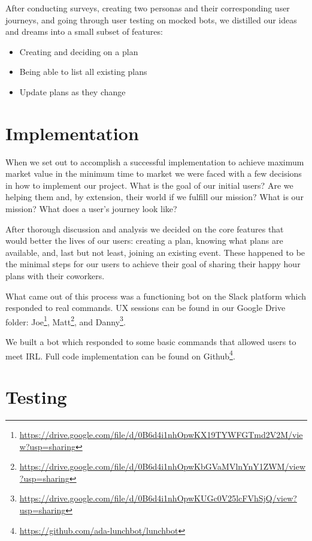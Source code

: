 \documentclass[english,a4paper,]{report}
\renewcommand{\href}[2]{#2\footnote{\url{#1}}}
\providecommand{\tightlist}{%
  \setlength{\itemsep}{0pt}\setlength{\parskip}{0pt}}
\begin{document}
After conducting surveys, creating two personas and their corresponding
user journeys, and going through user testing on mocked bots, we
distilled our ideas and dreams into a small subset of features:

\begin{itemize}
\tightlist
\item
  Creating and deciding on a plan
\item
  Being able to list all existing plans
\item
  Update plans as they change
\end{itemize}

\chapter{Implementation}\label{implementation}

When we set out to accomplish a successful implementation to achieve
maximum market value in the minimum time to market we were faced with a
few decisions in how to implement our project. What is the goal of our
initial users? Are we helping them and, by extension, their world if we
fulfill our mission? What is our mission? What does a user's journey
look like?

After thorough discussion and analysis we decided on the core features
that would better the lives of our users: creating a plan, knowing what
plans are available, and, last but not least, joining an existing event.
These happened to be the minimal steps for our users to achieve their
goal of sharing their happy hour plans with their coworkers.

What came out of this process was a functioning bot on the Slack
platform which responded to real commands. UX sessions can be found in
our Google Drive folder:
\href{https://drive.google.com/file/d/0B6d4i1nhOpwKX19TYWFGTmd2V2M/view?usp=sharing}{Joe},
\href{https://drive.google.com/file/d/0B6d4i1nhOpwKbGVaMVlnYnY1ZWM/view?usp=sharing}{Matt},
and
\href{https://drive.google.com/file/d/0B6d4i1nhOpwKUGc0V25lcFVhSjQ/view?usp=sharing}{Danny}.

We built a bot which responded to some basic commands that allowed users
to meet IRL. Full code implementation can be found on
\href{https://github.com/ada-lunchbot/lunchbot}{Github}.

\chapter{Testing}\label{testing}
\end{document}
